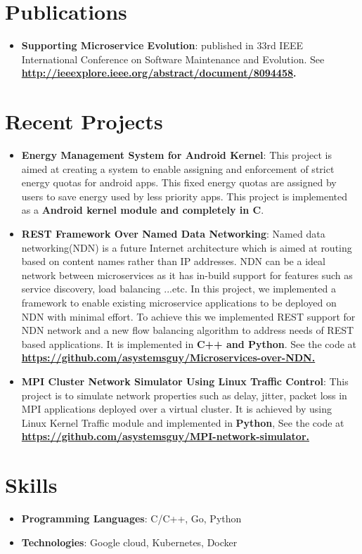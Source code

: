 \documentclass[letterpaper,11pt]{article}
\newcommand{\resumeItem}[2]{
  \item\small{
    \textbf{#1}{: #2 \vspace{-2pt}}
  }
}
\newcommand{\resumeSubItem}[2]{\resumeItem{#1}{#2}\vspace{-4pt}}
\newcommand{\resumeSubHeadingListStart}{\begin{itemize}[leftmargin=*]}
\newcommand{\resumeSubHeadingListEnd}{\end{itemize}}
\begin{document}
\section{Publications}
  \resumeSubHeadingListStart
    \resumeSubItem {Supporting Microservice Evolution} {published in 33rd IEEE International Conference on Software Maintenance and Evolution. 
    See \textbf{\href{http://ieeexplore.ieee.org/abstract/document/8094458}{http://ieeexplore.ieee.org/abstract/document/8094458}.}
    }
  \resumeSubHeadingListEnd

\section{Recent Projects}
  \resumeSubHeadingListStart
    \resumeSubItem{Energy Management System for Android Kernel}
      {This project is aimed at creating a system to enable assigning and enforcement of strict energy quotas for android apps. 
      This fixed energy quotas are assigned by users to save energy used by less priority apps.
      This project is implemented as a \textbf{Android kernel module and completely in C}.}
    \resumeSubItem{REST Framework Over Named Data Networking}
      {Named data networking(NDN) is a future Internet architecture which is aimed at routing based on content names rather than IP addresses. 
       NDN can be a ideal network between microservices as it has in-build support for features such as service discovery, load balancing ...etc. 
       In this project, we implemented a framework to enable existing microservice applications to be deployed on NDN with minimal effort.
       To achieve this we implemented REST support for NDN network and a new flow balancing algorithm to address needs of REST based applications.
       It is implemented in \textbf{C++ and Python}. 
       See the code at \textbf{\href{https://github.com/asystemsguy/Microservices-over-NDN}{https://github.com/asystemsguy/Microservices-over-NDN.}}
      }
    \resumeSubItem{MPI Cluster Network Simulator Using Linux Traffic Control}
      {This project is to simulate network properties such as delay, jitter, packet loss in MPI applications deployed over a virtual cluster.
       It is achieved by using Linux Kernel Traffic module and implemented in \textbf{Python}, 
       See the code at \textbf{\href{ https://github.com/asystemsguy/MPI-network-simulator}{https://github.com/asystemsguy/MPI-network-simulator.}}}
 \resumeSubHeadingListEnd


\section{Skills}
  \resumeSubHeadingListStart
    \item{
      \textbf{Programming Languages}{: C/C++, Go, Python }
      \hfill
      }
    \item{
    \textbf{Technologies}{: Google cloud, Kubernetes, Docker}
    }
 \resumeSubHeadingListEnd


\end{document}

